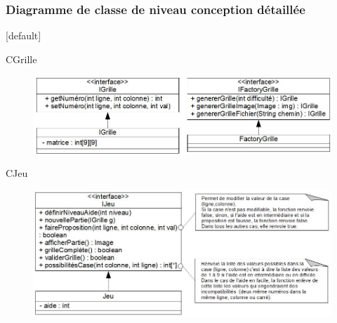 \documentclass{beamer}
\begin{document}
\begin{frame}
\frametitle{Diagramme de classe de niveau conception détaillée}
  [default]
  \begin{block}{\footnotesize{CGrille}}
    \begin{figure}[h]
      \includegraphics[scale=0.37]{diagramme_classe_detaillee_CGrille.JPG}
    \end{figure}
  \end{block}
  \pause
  \begin{block}{\footnotesize{CJeu}}
    \begin{figure}[h]
      \includegraphics[scale=0.37]{diagramme_classe_detaillee_CJeu.JPG}
    \end{figure}
  \end{block}
\end{frame}
\end{document}
